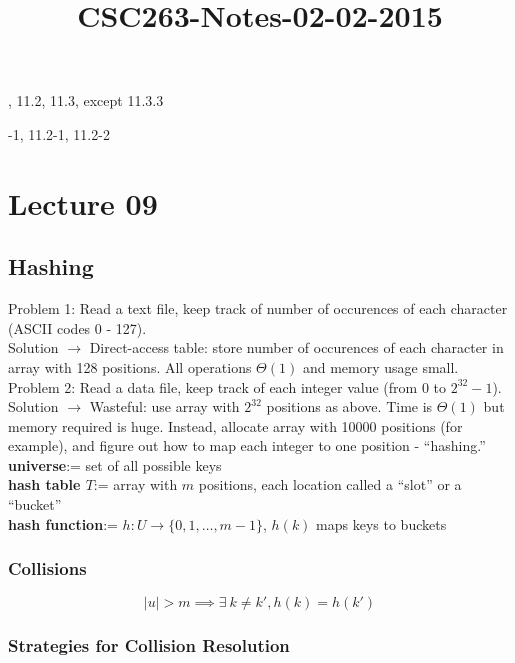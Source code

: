 



\title{CSC263-Notes-02-02-2015}



\reversemarginpar
\mpreadings 

, 11.2, 11.3, except 11.3.3 \\

\mpselftest

-1, 11.2-1, 11.2-2 

\section*{Lecture 09}

\subsection*{Hashing}

\noindent Problem 1: Read a text file, keep track of number of occurences of each character (ASCII codes 0 - 127). \\
Solution $\rightarrow$ Direct-access table: store number of occurences of each character in array with 128 positions. All operations $\Theta(1)$ and memory usage small. \\
Problem 2: Read a data file, keep track of each integer value (from 0 to $2^{32} - 1$). \\
Solution $\rightarrow$ Wasteful: use array with $2^{32}$ positions as above. Time is $\Theta(1)$ but memory required is huge. Instead, allocate array with 10000 positions (for example), and figure out how to map each integer to one position - ``hashing.'' \\

\noindent \textbf{universe}:= set of all possible keys \\
\textbf{hash table $T$}:= array with $m$ positions, each location called a ``slot'' or a ``bucket'' \\
\textbf{hash function}:= $h: U \rightarrow \{0,1,\ldots,m-1\}$, $h(k)$ maps keys to buckets 

\subsubsection*{Collisions}
$$|u| > m \implies \exists\ k \neq k', h(k) = h(k')$$

\subsubsection*{Strategies for Collision Resolution}

